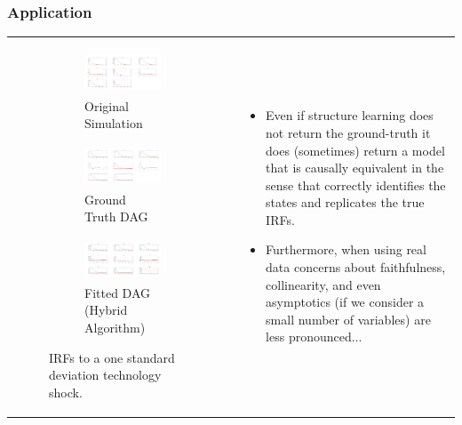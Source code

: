 \documentclass{beamer}
\begin{document}
\begin{frame}
    \frametitle{Application}
    \begin{tabular}{ p{5cm} p{5cm} }
        \begin{figure}
            \centering
            \begin{subfigure}{5cm}
              \centering
              \includegraphics[width=\linewidth, height=1.25cm]{images/rbc_sim_irf.png} 
              \caption{Original Simulation}
              \label{simirf}
            \end{subfigure}
            \begin{subfigure}{5cm}
              \centering  
              \includegraphics[width=\linewidth, height=1.25cm]{images/rbc_true_dag_irfs.png}
              \caption{Ground Truth DAG}
              \label{gtirf}
            \end{subfigure}
            \begin{subfigure}{5cm}
              \centering  
              \includegraphics[width=\linewidth, height=1.25cm]{images/rbc_hybrid_irfs.png}
              \caption{Fitted DAG (Hybrid Algorithm)}
              \label{hirf}
            \end{subfigure}
            \caption{IRFs to a one standard deviation technology shock.}
            \label{dag10}
        \end{figure}
        &
        \begin{itemize}
            \item Even if structure learning does not return the ground-truth it does (sometimes) return a model that is causally equivalent in the sense that correctly identifies the states and replicates the true IRFs.
            \item Furthermore, when using real data concerns about faithfulness, collinearity, and even asymptotics (if we consider a small number of variables) are less pronounced...
        \end{itemize}
    \end{tabular}
\end{frame}
\end{document}
